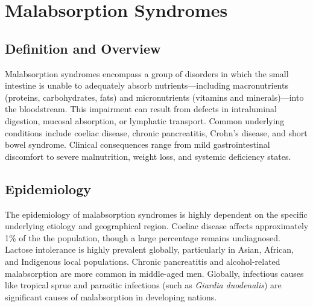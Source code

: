 \chapter{Malabsorption Syndromes}

\section*{Definition and Overview}
Malabsorption syndromes encompass a group of disorders in which the small intestine is unable to adequately absorb nutrients---including macronutrients (proteins, carbohydrates, fats) and micronutrients (vitamins and minerals)---into the bloodstream. This impairment can result from defects in intraluminal digestion, mucosal absorption, or lymphatic transport. Common underlying conditions include coeliac disease, chronic pancreatitis, Crohn's disease, and short bowel syndrome. Clinical consequences range from mild gastrointestinal discomfort to severe malnutrition, weight loss, and systemic deficiency states.

\section*{Epidemiology}
The epidemiology of malabsorption syndromes is highly dependent on the specific underlying etiology and geographical region. Coeliac disease affects approximately 1\% of the the population, though a large percentage remains undiagnosed. Lactose intolerance is highly prevalent globally, particularly in Asian, African, and Indigenous local populations. Chronic pancreatitis and alcohol-related malabsorption are more common in middle-aged men. Globally, infectious causes like tropical sprue and parasitic infections (such as \textit{Giardia duodenalis}) are significant causes of malabsorption in developing nations.

